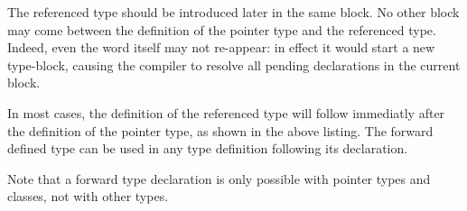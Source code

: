 The referenced type should be introduced later in the same  block. 
No other block may come between the definition of the pointer type and the referenced type.
Indeed, even the word  itself may not re-appear: in effect it
would start a new type-block, causing the compiler to resolve all pending
declarations in the current block. 

In most cases, the definition of the referenced type will follow immediatly 
after the definition of the pointer type, as shown in the above listing. 
The forward defined type can be used in any type definition following its 
declaration.

Note that a forward type declaration is only possible with pointer types and
classes, not with other types.

